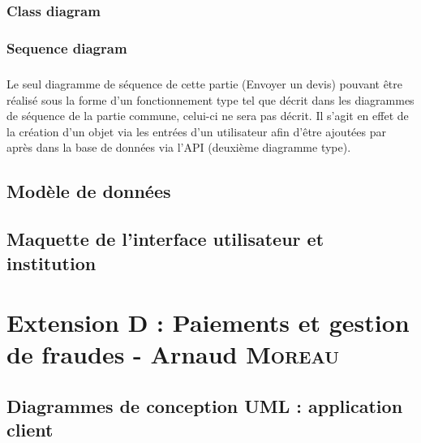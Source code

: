 \documentclass[]{report}
\begin{document}
\subsection{Class diagram}



\newpage

\subsection{Sequence diagram}

\paragraph{}Le seul diagramme de séquence de cette partie (Envoyer un devis) pouvant être réalisé sous la forme d’un fonctionnement type tel que décrit dans les diagrammes de séquence de la partie commune, celui-ci ne sera pas décrit. Il s’agit en effet de la création d’un objet via les entrées d’un utilisateur afin d’être ajoutées par après dans la base de données via l’API (deuxième diagramme type).

\newpage

\section{Modèle de données}



\newpage

\section{Maquette de l'interface utilisateur et institution}



\newpage




\chapter{Extension D : Paiements et gestion de fraudes - Arnaud \textsc{Moreau}}





\newpage




\section{Diagrammes de conception UML : application client}
\end{document}
